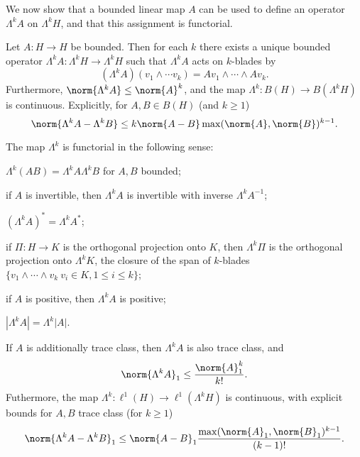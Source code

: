 \documentclass[12pt]{amsart}
\begin{document}
We now show that a bounded linear map $A$ can be used to define an operator $\Lambda^k A$ on $\Lambda^k H$, and that this assignment is functorial.
\begin{thm}\label{extends}Let $A:H \to H$ be bounded. Then for each $k$ there exists a unique bounded operator $\Lambda^k A: \Lambda^k H \to \Lambda^k H$ such that $\Lambda^k A$ acts on $k$-blades by
\[(\Lambda^k A)(v_1\wedge \cdots v_k) = Av_1 \wedge \cdots \wedge Av_k.\] Furthermore, $\norm{\Lambda^k A} \leq \norm{A}^k$, and the map $\Lambda^k:B(H) \to B(\Lambda^k H)$ is continuous. Explicitly, for $A,B \in B(H)$ (and $k \geq 1$)
\begin{equation}\label{ctsb}\norm{\Lambda^k A - \Lambda^k B} \leq k\norm{A-B}\max(\norm{A},\norm{B})^{k-1}.\end{equation}

The map $\Lambda^k$ is functorial in the following sense:
\begin{romanumerate}
\item $\Lambda^k (AB) = \Lambda^k A \Lambda^k B$ for $A,B$ bounded;
\item if $A$ is invertible, then $\Lambda^k A$ is invertible with inverse $\Lambda^k A^{-1}$;
\item $(\Lambda^k A)^\ast = \Lambda^k A^\ast$;
\item if $\Pi:H \to K$ is the orthogonal projection onto $K$, then $\Lambda^k \Pi$ is the orthogonal projection onto $\Lambda^k K$, the closure of the span of $k$-blades $\{v_1 \wedge \cdots \wedge v_k\: v_i \in K, 1 \leq i \leq k\}$;
\item if $A$ is positive, then $\Lambda^k A$ is positive;
\item $|\Lambda^k A| = \Lambda^k |A|$.
\end{romanumerate}


If $A$ is additionally trace class, then $\Lambda^k A$ is also trace class, and
\[\norm{\Lambda^k A}_1 \leq \frac{\norm{A}_1^k}{k!}.\] Futhermore, the map $\Lambda^k:\ell^1(H) \to \ell^1(\Lambda^k H)$ is continuous, with explicit bounds for $A,B$ trace class (for $k \geq 1$)
\begin{equation}\label{ctsbp}\norm{\Lambda^k A - \Lambda^k B}_1 \leq \norm{A-B}_1\frac{\max(\norm{A}_1,\norm{B}_1)^{k-1}}{(k-1)!}.\end{equation}
\end{thm}
\end{document}
